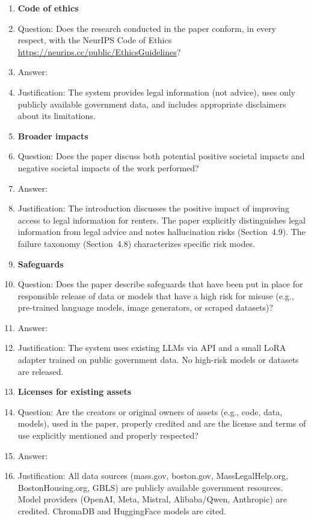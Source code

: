 \begin{enumerate}
\item {\bf Code of ethics}
    \item[] Question: Does the research conducted in the paper conform, in every respect, with the NeurIPS Code of Ethics \url{https://neurips.cc/public/EthicsGuidelines}?
    \item[] Answer: \answerYes{}
    \item[] Justification: The system provides legal information (not advice), uses only publicly available government data, and includes appropriate disclaimers about its limitations.

\item {\bf Broader impacts}
    \item[] Question: Does the paper discuss both potential positive societal impacts and negative societal impacts of the work performed?
    \item[] Answer: \answerYes{}
    \item[] Justification: The introduction discusses the positive impact of improving access to legal information for renters. The paper explicitly distinguishes legal information from legal advice and notes hallucination risks (Section~4.9). The failure taxonomy (Section~4.8) characterizes specific risk modes.

\item {\bf Safeguards}
    \item[] Question: Does the paper describe safeguards that have been put in place for responsible release of data or models that have a high risk for misuse (e.g., pre-trained language models, image generators, or scraped datasets)?
    \item[] Answer: \answerNA{}
    \item[] Justification: The system uses existing LLMs via API and a small LoRA adapter trained on public government data. No high-risk models or datasets are released.

\item {\bf Licenses for existing assets}
    \item[] Question: Are the creators or original owners of assets (e.g., code, data, models), used in the paper, properly credited and are the license and terms of use explicitly mentioned and properly respected?
    \item[] Answer: \answerYes{}
    \item[] Justification: All data sources (mass.gov, boston.gov, MassLegalHelp.org, BostonHousing.org, GBLS) are publicly available government resources. Model providers (OpenAI, Meta, Mistral, Alibaba/Qwen, Anthropic) are credited. ChromaDB and HuggingFace models are cited.


\end{enumerate}
